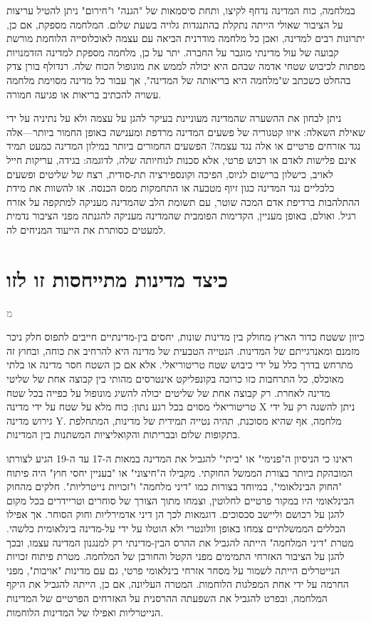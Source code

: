 \documentclass[10pt,oneside]{book}
\newcommand{\hebrewchapter}[2]{%
  \chapter*{#1}%
  \addcontentsline{toc}{chapter}{#1}%
  \lettrine[lines=4, lhang=0.1, loversize=0.5, findent=0pt]{\textcolor{gray} #2}{}%
}
\begin{document}
במלחמה, כוח המדינה נדחף לקיצו, ותחת סיסמאות של "הגנה" ו"חירום" ניתן להטיל עריצות על הציבור שאולי הייתה נתקלת בהתנגדות גלויה בשעת שלום. המלחמה מספקת, אם כן, יתרונות רבים למדינה, ואכן כל מלחמה מודרנית הביאה עם עצמה לאוכלוסייה הלוחמת מורשת קבועה של עול מדינתי מוגבר על החברה. יתר על כן, מלחמה מספקת למדינה הזדמנויות מפתות לכיבוש שטחי אדמה שבהם היא יכולה לממש את מונופול הכוח שלה. רנדולף בורן צדק בהחלט כשכתב ש"מלחמה היא בריאותה של המדינה", אך עבור כל מדינה מסוימת מלחמה עשויה להכתיב בריאות או פגיעה חמורה.

ניתן לבחון את ההשערה שהמדינה מעוניינת בעיקר להגן על עצמה ולא על נתיניה על ידי שאילת השאלה: איזו קטגוריה של פשעים המדינה מרדפת ומענישה באופן החמור ביותר—אלה נגד אזרחים פרטיים או אלה נגד עצמה? הפשעים החמורים ביותר במילון המדינה כמעט תמיד אינם פלישות לאדם או רכוש פרטי, אלא סכנות לנוחיותה שלה, לדוגמה: בגידה, עריקות חייל לאויב, כישלון ברישום לגיוס, הפיכה וקונספירציה תת-סודית, רצח של שליטים ופשעים כלכליים נגד המדינה כגון זיוף מטבעה או התחמקות ממס הכנסה. או להשוות את מידת ההתלהבות ברדיפת אדם המכה שוטר, עם תשומת הלב שהמדינה מעניקה למתקפה על אזרח רגיל. ואולם, באופן מעניין, הקדימות הפומבית שהמדינה מעניקה להגנתה מפני הציבור נדמית למעטים כסותרת את הייעוד המניחים לה.


\hebrewchapter{כיצד מדינות מתייחסות זו לזו}{מ}
כיוון ששטח כדור הארץ מחולק בין מדינות שונות, יחסים בין-מדינתיים חייבים לתפוס חלק ניכר מזמנם ומאנרגייתם של המדינות. הנטייה הטבעית של מדינה היא להרחיב את כוחה, ובחוץ זה מתרחש בדרך כלל על ידי כיבוש שטח טריטוריאלי. אלא אם כן השטח חסר מדינה או בלתי מאוכלס, כל התרחבות כזו כרוכה בקונפליקט אינטרסים מהותי בין קבוצה אחת של שליטי מדינה לאחרת. רק קבוצה אחת של שליטים יכולה להשיג מונופול על כפייה בכל שטח טריטוריאלי מסוים בכל רגע נתון: כוח מלא על שטח על ידי מדינה X ניתן להשגה רק על ידי גירוש מדינה Y. מלחמה, אף שהיא מסוכנת, תהיה נטייה תמידית של מדינות, המתחלפת בתקופות שלום ובבריתות והקואליציות המשתנות בין המדינות.

ראינו כי הניסיון ה"פנימי" או "ביתי" להגביל את המדינה במאות ה-17 עד ה-19 הגיע לצורתו המובהקת ביותר בצורת הממשל החוקתי. מקבילו ה"חיצוני" או "בעניין יחסי חוץ" היה פיתוח "החוק הבינלאומי", במיוחד בצורות כמו "דיני מלחמה" ו"זכויות נייטרליות". חלקים מהחוק הבינלאומי היו במקור פרטיים לחלוטין, וצמחו מתוך הצורך של סוחרים וטריידרים בכל מקום להגן על רכושם וליישב סכסוכים. דוגמאות לכך הן דיני אדמירליות וחוק הסוחר. אך אפילו הכללים הממשלתיים צמחו באופן וולונטרי ולא הוטלו על ידי על-מדינה בינלאומית כלשהי. מטרת "דיני המלחמה" הייתה להגביל את ההרס הבין-מדינתי רק למנגנון המדינה עצמו, ובכך להגן על הציבור האזרחי התמימים מפני הקטל והחורבן של המלחמה. מטרת פיתוח זכויות הנייטרלים הייתה לשמור על מסחר אזרחי בינלאומי פרטי, גם עם מדינות "אויבות", מפני החרמה על ידי אחת המפלגות הלוחמות. המטרה העליונה, אם כן, הייתה להגביל את היקף המלחמה, ובפרט להגביל את השפעתה ההרסנית על האזרחים הפרטיים של המדינות הנייטרליות ואפילו של המדינות הלוחמות.
\end{document}
